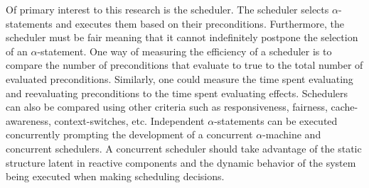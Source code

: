 Of primary interest to this research is the scheduler.
The scheduler selects $\alpha$-statements and executes them based on their preconditions.
Furthermore, the scheduler must be fair meaning that it cannot indefinitely postpone the selection of an $\alpha$-statement.
One way of measuring the efficiency of a scheduler is to compare the number of preconditions that evaluate to true to the total number of evaluated preconditions.
Similarly, one could measure the time spent evaluating and reevaluating preconditions to the time spent evaluating effects.
Schedulers can also be compared using other criteria such as responsiveness, fairness, cache-awareness, context-switches, etc.
Independent $\alpha$-statements can be executed concurrently prompting the development of a concurrent $\alpha$-machine and concurrent schedulers.
A concurrent scheduler should take advantage of the static structure latent in reactive components and the dynamic behavior of the system being executed when making scheduling decisions.


